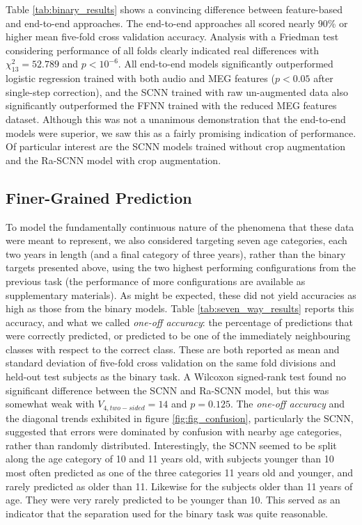 \documentclass[fleqn,10pt]{wlscirep}
\begin{document}
Table \ref{tab:binary_results} shows a convincing difference between feature-based and end-to-end approaches. The end-to-end approaches all scored nearly 90\% or higher mean five-fold cross validation accuracy. Analysis with a Friedman test considering performance of all folds clearly indicated real differences with $\chi^2_{13}=52.789$ and $p<10^{-6}$. All end-to-end models significantly outperformed logistic regression trained with both audio and MEG features ($p<0.05$ after single-step correction), and the SCNN trained with raw un-augmented data also significantly outperformed the FFNN trained with the reduced MEG features dataset. Although this was not a unanimous demonstration that the end-to-end models were superior, we saw this as a fairly promising indication of performance. Of particular interest are the SCNN models trained without crop augmentation and the Ra-SCNN model with crop augmentation.

\subsection*{Finer-Grained Prediction}

To model the fundamentally continuous nature of the phenomena that these data were meant to represent, we also considered targeting seven age categories, each two years in length (and a final category of three years), rather than the binary targets presented above, using the two highest performing configurations from the previous task (the performance of more configurations are available as supplementary materials). As might be expected, these did not yield accuracies as high as those from the binary models. Table \ref{tab:seven_way_results} reports this accuracy, and what we called {\em one-off accuracy}: the percentage of predictions that were correctly predicted, or predicted to be one of the immediately neighbouring classes with respect to the correct class. These are both reported as mean and standard deviation of five-fold cross validation on the same fold divisions and held-out test subjects as the binary task. A Wilcoxon signed-rank test found no significant difference between the SCNN and Ra-SCNN model, but this was somewhat weak with $V_{4, two-sided}=14$ and $p=0.125$. The {\em one-off accuracy} and the diagonal trends exhibited in figure \ref{fig:fig_confusion}, particularly the SCNN, suggested that errors were dominated by confusion with nearby age categories, rather than randomly distributed. Interestingly, the SCNN seemed to be split along the age category of 10 and 11 years old, with subjects younger than 10 most often predicted as one of the three categories 11 years old and younger, and rarely predicted as older than 11. Likewise for the subjects older than 11 years of age. They were very rarely predicted to be younger than 10. This served as an indicator that the separation used for the binary task was quite reasonable.
\end{document}

